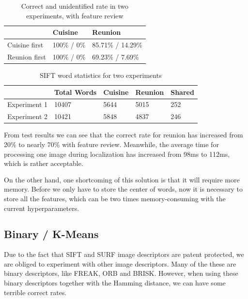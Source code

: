 \documentclass[a4paper]{scrartcl}
\begin{document}
\begin{table}[H]
\centering
\caption{Correct and unidentified rate in two experiments, with feature review}
\label{rates_sym}
\begin{tabular}{l l l}
\hline
        & Cuisine        &   Reunion      \\ \hline
Cuisine first   & 100\% / 0\% & 85.71\% / 14.29\% \\ \hline
Reunion first &  100\% / 0\% & 69.23\% / 7.69\% \\ \hline
\end{tabular}
\end{table}


\begin{table}[H]
\centering
\caption{SIFT word statistics for two experiments}
\label{words_sym}
\begin{tabular}{|l|l|l|l|l|}
\hline
             & Total Words & Cuisine & Reunion & Shared \\ \hline
Experiment 1 & 10407       & 5644    & 5015    & 252    \\ \hline
Experiment 2 & 10421       & 5848    & 4837    & 246   \\ \hline
\end{tabular}
\end{table}

From test results we can see that the correct rate for reunion has increased from 20\% to nearly 70\% with feature review. Meanwhile, the average time for processing one image during localization has increased from 98ms to 112ms, which is rather acceptable. 

On the other hand, one shortcoming of this solution is that it will require more memory. Before we only have to store the center of words, now it is necessary to store all the features, which can be two times memory-consuming with the current hyperparameters.

\subsection{Binary / K-Means}
Due to the fact that SIFT and SURF image descriptors are patent protected, we are obliged to experiment with other image descriptors. Many of the these are binary descriptors, like FREAK, ORB and BRISK. However, when using these binary descriptors together with the Hamming distance, we can have some terrible correct rates. 
\end{document}
